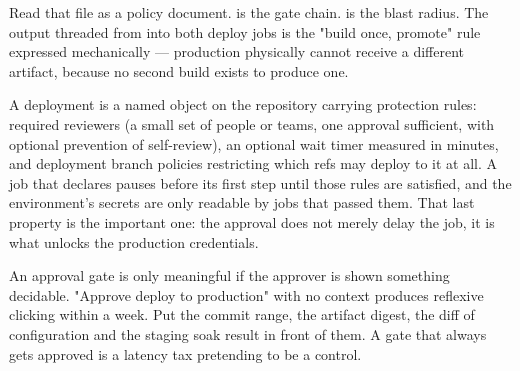 Read that file as a policy document.  is the gate chain.  is the blast radius. The  output threaded from  into both deploy jobs is the "build once, promote" rule expressed mechanically --- production physically cannot receive a different artifact, because no second build exists to produce one.

 A deployment  is a named object on the repository carrying protection rules: required reviewers (a small set of people or teams, one approval sufficient, with optional prevention of self-review), an optional wait timer measured in minutes, and deployment branch policies restricting which refs may deploy to it at all. A job that declares  pauses before its first step until those rules are satisfied, and the environment's secrets are only readable by jobs that passed them. That last property is the important one: the approval does not merely delay the job, it is what unlocks the production credentials.

\begin{opsnote}
An approval gate is only meaningful if the approver is shown something decidable. "Approve deploy to production" with no context produces reflexive clicking within a week. Put the commit range, the artifact digest, the diff of configuration and the staging soak result in front of them. A gate that always gets approved is a latency tax pretending to be a control.
\end{opsnote}

